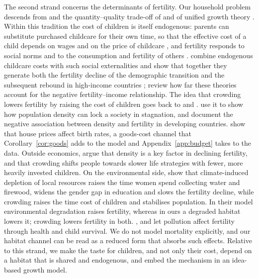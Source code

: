 \documentclass[11pt]{article}
\begin{document}
The second strand concerns the determinants of fertility. Our household problem descends from
\citet{barro1989} and the quantity--quality trade-off of \citet{beckerlewis1973} and of unified growth
theory \citep{galor2000,doep05}. Within this tradition the cost of children is itself endogenous: parents
can substitute purchased childcare for their own time, so that the effective cost of a child depends on
wages and on the price of childcare \citep{hazan15,day2016}, and fertility responds to social norms and to
the consumption and fertility of others \citep{palivos2001,munshi2006}. \citet{Dz} combine endogenous
childcare costs with such social externalities and show that together they generate both the fertility
decline of the demographic transition and the subsequent rebound in high-income countries
\citep{myrskyla2009}; \citet{jones11} review how far these theories account for the negative
fertility--income relationship. The idea that crowding lowers fertility by raising the cost of children
goes back to \citet{goodsell} and \citet{thompson}. \citet{DAO2013442} use it to show how population density
can lock a society in stagnation, and \citet{DELACROIX201713} document the negative association between
density and fertility in developing countries. \citet{dettling2014} show that house prices affect
birth rates, a goods-cost channel that Corollary~\ref{cor:goods} adds to the model and
Appendix~\ref{app:budget} takes to the data. Outside economics, \citet{lutz2006} argue that density is a
key factor in declining fertility, and \citet{sng2017} that crowding shifts people towards slower life
strategies with fewer, more heavily invested children. On the environmental side,
\citet{dao25} show that climate-induced depletion of local resources raises the time women spend collecting
water and firewood, widens the gender gap in education and slows the fertility decline, while crowding
raises the time cost of children and stabilises population. In their model environmental degradation
raises fertility, whereas in ours a degraded habitat lowers it; crowding lowers fertility in both.
\citet{mari10}, \citet{Varvarigos2013} and
\citet{schaefer2020} let pollution affect fertility through health and child survival. We do not model
mortality explicitly, and our habitat channel can be read as a reduced form that absorbs such effects.
Relative to this
strand, we make the taste for children, and not only their cost, depend on a habitat that is shared and
endogenous, and embed the mechanism in an idea-based growth model.
\end{document}
